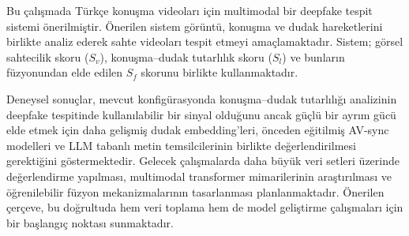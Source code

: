 \documentclass[conference]{IEEEtran}
\begin{document}
Bu çalışmada Türkçe konuşma videoları için multimodal bir deepfake tespit sistemi önerilmiştir. Önerilen sistem görüntü, konuşma ve dudak hareketlerini birlikte analiz ederek sahte videoları tespit etmeyi amaçlamaktadır. Sistem; görsel sahtecilik skoru ($S_v$), konuşma--dudak tutarlılık skoru ($S_l$) ve bunların füzyonundan elde edilen $S_f$ skorunu birlikte kullanmaktadır.

Deneysel sonuçlar, mevcut konfigürasyonda konuşma--dudak tutarlılığı analizinin deepfake tespitinde kullanılabilir bir sinyal olduğunu ancak güçlü bir ayrım gücü elde etmek için daha gelişmiş dudak embedding'leri, önceden eğitilmiş AV-sync modelleri ve LLM tabanlı metin temsilcilerinin birlikte değerlendirilmesi gerektiğini göstermektedir. Gelecek çalışmalarda daha büyük veri setleri üzerinde değerlendirme yapılması, multimodal transformer mimarilerinin araştırılması ve öğrenilebilir füzyon mekanizmalarının tasarlanması planlanmaktadır. Önerilen çerçeve, bu doğrultuda hem veri toplama hem de model geliştirme çalışmaları için bir başlangıç noktası sunmaktadır.



\end{document}
